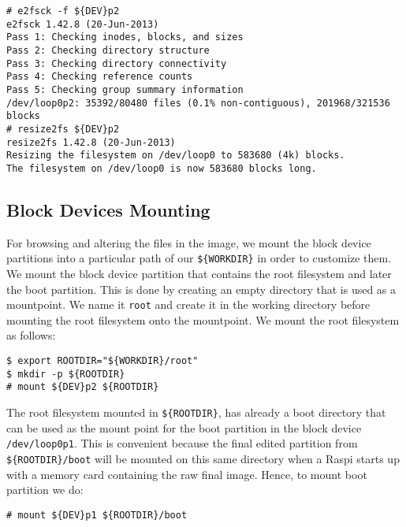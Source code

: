 \begin{lstlisting}[]
# e2fsck -f ${DEV}p2
e2fsck 1.42.8 (20-Jun-2013)
Pass 1: Checking inodes, blocks, and sizes
Pass 2: Checking directory structure
Pass 3: Checking directory connectivity
Pass 4: Checking reference counts
Pass 5: Checking group summary information
/dev/loop0p2: 35392/80480 files (0.1% non-contiguous), 201968/321536 blocks
# resize2fs ${DEV}p2
resize2fs 1.42.8 (20-Jun-2013)
Resizing the filesystem on /dev/loop0 to 583680 (4k) blocks.
The filesystem on /dev/loop0 is now 583680 blocks long.
\end{lstlisting}
\FloatBarrier

\subsection{Block Devices Mounting}
For browsing and altering the files in the image, we mount the block
device partitions into a particular path of our \texttt{\$\{WORKDIR\}} in order
to customize them. We mount the block device partition that
contains the root filesystem and later the boot partition. This is done by
creating an empty directory that is used as a mountpoint. We name it
\texttt{root} and create it in the working directory before mounting the
root filesystem onto the mountpoint. We mount the root filesystem
as follows:

\begin{lstlisting}[]
$ export ROOTDIR="${WORKDIR}/root"
$ mkdir -p ${ROOTDIR}
# mount ${DEV}p2 ${ROOTDIR}
\end{lstlisting}
\FloatBarrier
\vspace{-5mm}

The root filesystem mounted in \texttt{\$\{ROOTDIR\}}, has already a boot
directory that can be used as the mount point for the boot partition
in the block device \texttt{/dev/loop0p1}. This is convenient because
the final edited partition from \texttt{\$\{ROOTDIR\}/boot} will be mounted on
this same directory when a \ac{Raspi} starts up with a memory card
containing the raw final image. Hence, to mount boot partition we do:

\begin{lstlisting}[]
# mount ${DEV}p1 ${ROOTDIR}/boot
\end{lstlisting}
\FloatBarrier
\vspace{-5mm}

